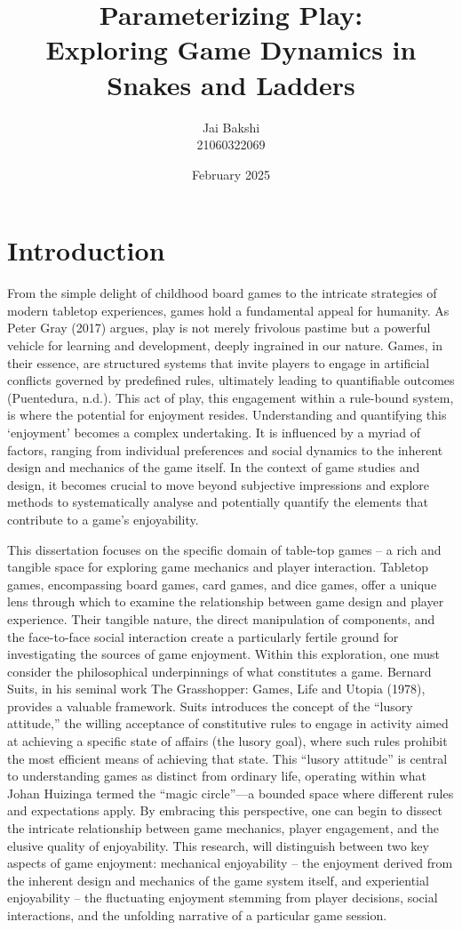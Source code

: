 \documentclass[12pt]{report}
\title{Parameterizing Play:\\ Exploring Game Dynamics in Snakes and Ladders}
\author{Jai Bakshi \\ 21060322069}
\date{February 2025}
\begin{document}
	\maketitle
	\chapter{Introduction}
	From the simple delight of childhood board games to the intricate strategies of modern tabletop experiences, games hold a fundamental appeal for humanity. As Peter Gray (2017)  argues, play is not merely frivolous pastime but a powerful vehicle for learning and development, deeply ingrained in our nature. Games, in their essence, are structured systems that invite players to engage in artificial conflicts governed by predefined rules, ultimately leading to quantifiable outcomes (Puentedura, n.d.). This act of play, this engagement within a rule-bound system, is where the potential for enjoyment resides. Understanding and quantifying this ‘enjoyment’ becomes a complex undertaking. It is influenced by a myriad of factors, ranging from individual preferences and social dynamics to the inherent design and mechanics of the game itself. In the context of game studies and design, it becomes crucial to move beyond subjective impressions and explore methods to systematically analyse and potentially quantify the elements that contribute to a game's enjoyability.
	
	This dissertation focuses on the specific domain of table-top games – a rich and tangible space for exploring game mechanics and player interaction. Tabletop games, encompassing board games, card games, and dice games, offer a unique lens through which to examine the relationship between game design and player experience. Their tangible nature, the direct manipulation of components, and the face-to-face social interaction create a particularly fertile ground for investigating the sources of game enjoyment. Within this exploration, one must consider the philosophical underpinnings of what constitutes a game. Bernard Suits, in his seminal work The Grasshopper: Games, Life and Utopia (1978), provides a valuable framework. Suits introduces the concept of the ``lusory attitude,'' the willing acceptance of constitutive rules to engage in activity aimed at achieving a specific state of affairs (the lusory goal), where such rules prohibit the most efficient means of achieving that state. This ``lusory attitude'' is central to understanding games as distinct from ordinary life, operating within what Johan Huizinga termed the ``magic circle''—a bounded space where different rules and expectations apply. By embracing this perspective, one can begin to dissect the intricate relationship between game mechanics, player engagement, and the elusive quality of enjoyability. This research,  will distinguish between two key aspects of game enjoyment: mechanical enjoyability – the enjoyment derived from the inherent design and mechanics of the game system itself, and experiential enjoyability – the fluctuating enjoyment stemming from player decisions, social interactions, and the unfolding narrative of a particular game session.
	
\end{document}
